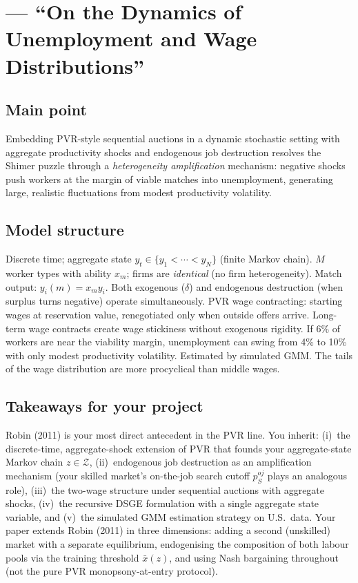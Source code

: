 \documentclass[12pt]{article}
\begin{document}
\section{\citet{robin2011} --- ``On the Dynamics of Unemployment and Wage Distributions''}

\subsection*{Main point}

Embedding PVR-style sequential auctions in a dynamic stochastic setting with aggregate productivity shocks and endogenous job destruction resolves the Shimer puzzle through a \emph{heterogeneity amplification} mechanism: negative shocks push workers at the margin of viable matches into unemployment, generating large, realistic fluctuations from modest productivity volatility.

\subsection*{Model structure}

Discrete time; aggregate state $y_t \in \{y_1 < \cdots < y_N\}$ (finite Markov chain). $M$ worker types with ability $x_m$; firms are \emph{identical} (no firm heterogeneity). Match output: $y_i(m) = x_m y_i$. Both exogenous ($\delta$) and endogenous destruction (when surplus turns negative) operate simultaneously. PVR wage contracting: starting wages at reservation value, renegotiated only when outside offers arrive. Long-term wage contracts create wage stickiness without exogenous rigidity. If 6\% of workers are near the viability margin, unemployment can swing from 4\% to 10\% with only modest productivity volatility. Estimated by simulated GMM. The tails of the wage distribution are more procyclical than middle wages.

\subsection*{Takeaways for your project}

Robin (2011) is your most direct antecedent in the PVR line. You inherit: (i)~the discrete-time, aggregate-shock extension of PVR that founds your aggregate-state Markov chain $z \in \mathcal{Z}$, (ii)~endogenous job destruction as an amplification mechanism (your skilled market's on-the-job search cutoff $p_S^{oj}$ plays an analogous role), (iii)~the two-wage structure under sequential auctions with aggregate shocks, (iv)~the recursive DSGE formulation with a single aggregate state variable, and (v)~the simulated GMM estimation strategy on U.S.\ data. Your paper extends Robin (2011) in three dimensions: adding a second (unskilled) market with a separate equilibrium, endogenising the composition of both labour pools via the training threshold $\bar{x}(z)$, and using Nash bargaining throughout (not the pure PVR monopsony-at-entry protocol).
\end{document}
